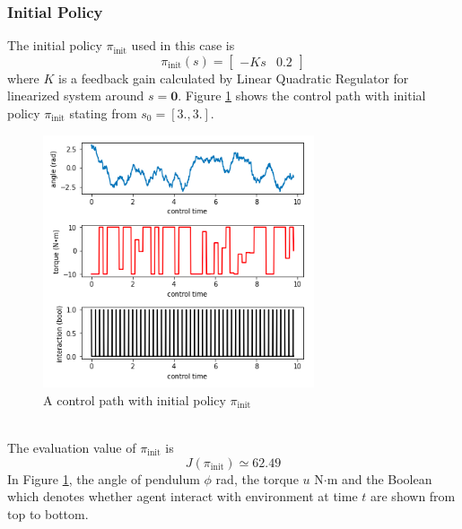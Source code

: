 \documentclass[english, dvipdfmx]{ampmt}             %
\begin{document}
\subsubsection{Initial Policy}
The initial policy $\pi_{\textrm{init}}$ used in this case is
\begin{equation}
	\pi_{\textrm{init}}(s) = \begin{bmatrix}-Ks&0.2\end{bmatrix}
\end{equation}
where $K$ is a feedback gain calculated by Linear Quadratic Regulator for linearized system around $s = \bm{0}$. Figure \ref{sample_02} shows the control path with initial policy $\pi_{\textrm{init}}$ stating from $s_0 = [3., 3.]$.
\begin{figure}[h]
	\centering
 	\includegraphics[width=8cm]{sample_02.png}
 	\caption{A control path with initial policy $\pi_{\textrm{init}}$} \label{sample_02}
\end{figure}\\
The evaluation value of $\pi_{\textrm{init}}$ is
\begin{equation}
	J(\pi_{\textrm{init}}) \simeq 62.49
\end{equation}
In Figure \ref{sample_02}, the angle of pendulum $\phi$ rad, the torque $u$ N$\cdot$m and the Boolean which denotes whether agent interact with environment at time $t$ are shown from top to bottom.
\end{document}
